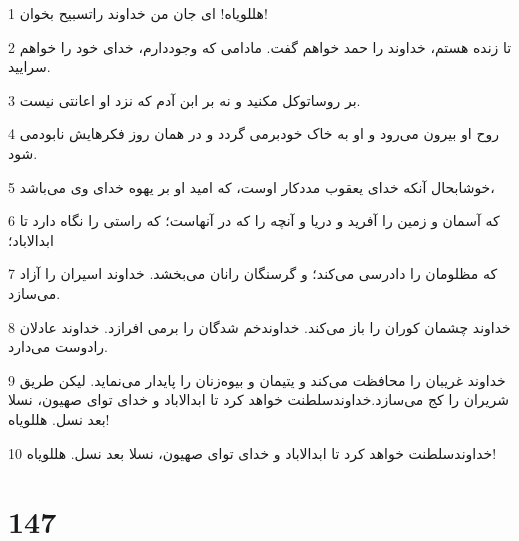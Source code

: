 \par 1 هللویاه! ای جان من خداوند راتسبیح بخوان!
\par 2 تا زنده هستم، خداوند را حمد خواهم گفت. مادامی که وجوددارم، خدای خود را خواهم سرایید.
\par 3 بر روساتوکل مکنید و نه بر ابن آدم که نزد او اعانتی نیست.
\par 4 روح او بیرون می‌رود و او به خاک خودبرمی گردد و در همان روز فکرهایش نابودمی شود.
\par 5 خوشابحال آنکه خدای یعقوب مددکار اوست، که امید او بر یهوه خدای وی می‌باشد،
\par 6 که آسمان و زمین را آفرید و دریا و آنچه را که در آنهاست؛ که راستی را نگاه دارد تا ابدالاباد؛
\par 7 که مظلومان را دادرسی می‌کند؛ و گرسنگان رانان می‌بخشد. خداوند اسیران را آزاد می‌سازد.
\par 8 خداوند چشمان کوران را باز می‌کند. خداوندخم شدگان را برمی افرازد. خداوند عادلان رادوست می‌دارد.
\par 9 خداوند غریبان را محافظت می‌کند و یتیمان و بیوه‌زنان را پایدار می‌نماید. لیکن طریق شریران را کج می‌سازد.خداوندسلطنت خواهد کرد تا ابدالاباد و خدای تو‌ای صهیون، نسلا بعد نسل. هللویاه!
\par 10 خداوندسلطنت خواهد کرد تا ابدالاباد و خدای تو‌ای صهیون، نسلا بعد نسل. هللویاه!
 
\chapter{147}

